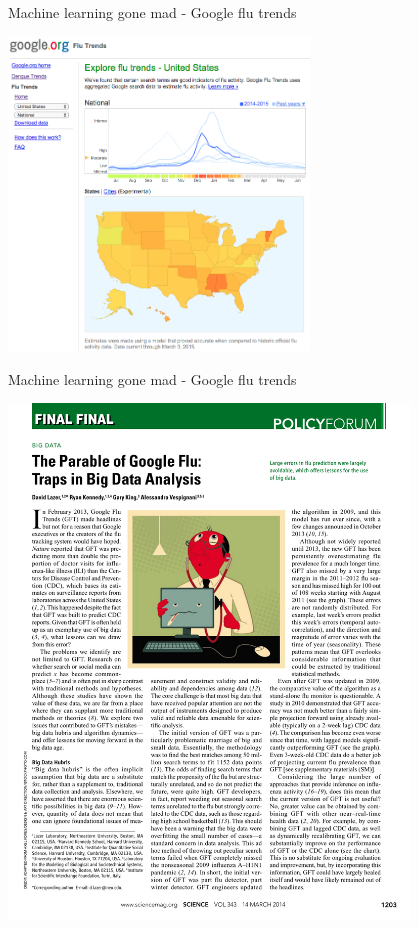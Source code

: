 \documentclass[pdf]{beamer}
\begin{document}
\begin{frame}{Machine learning gone mad - Google flu trends}
\begin{center}
		\includegraphics[width=0.6\textwidth]{googleFluTrend1.png}
\end{center}
\end{frame}

\begin{frame}{Machine learning gone mad - Google flu trends}
\begin{center}
		\includegraphics[width=0.8\textwidth]{googleFluTrend2.pdf}
\end{center}
\end{frame}
\end{document}
